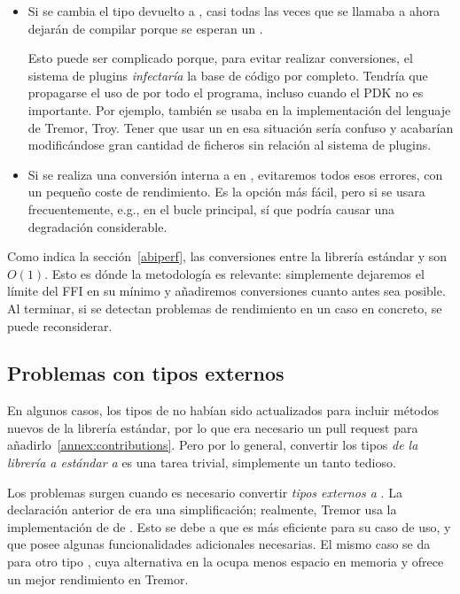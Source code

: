 \begin{itemize}
    \item Si se cambia el tipo devuelto a , casi todas las veces
        que se llamaba a  ahora dejarán de compilar porque se
        esperan un .

        Esto puede ser complicado porque, para evitar realizar conversiones, el
        sistema de plugins \emph{infectaría} la base de código por completo.
        Tendría que propagarse el uso de  por todo el programa,
        incluso cuando el PDK no es importante. Por ejemplo, 
        también se usaba en la implementación del lenguaje de Tremor, Troy.
        Tener que usar un  en esa situación sería confuso y
        acabarían modificándose gran cantidad de ficheros sin relación al
        sistema de plugins.

    \item Si se realiza una conversión interna a  en
        , evitaremos todos esos errores, con un pequeño coste de
        rendimiento. Es la opción más fácil, pero si  se
        usara frecuentemente, e.g., en el bucle principal, sí que podría causar
        una degradación considerable.
\end{itemize}

Como indica la sección~\ref{abiperf}, las conversiones entre la librería
estándar y \abistable son $O(1)$. Esto es dónde la metodología \work es
relevante: simplemente dejaremos el límite del FFI en su mínimo y añadiremos
conversiones cuanto antes sea posible. Al terminar, si se detectan problemas de
rendimiento en un caso en concreto, se puede reconsiderar.

\subsection{Problemas con tipos externos}

En algunos casos, los tipos de \abistable no habían sido actualizados para
incluir métodos nuevos de la librería estándar, por lo que era necesario un pull
request para añadirlo~\ref{annex:contributions}. Pero por lo general, convertir
los tipos \emph{de la librería a estándar a \abistable} es una tarea trivial,
simplemente un tanto tedioso.

Los problemas surgen cuando es necesario convertir \emph{tipos externos a
\abistable}. La declaración anterior de  era una simplificación;
realmente, Tremor usa la implementación de  de
. Esto se debe a que es más eficiente para su caso de uso, y
que posee algunas funcionalidades adicionales necesarias. El mismo caso se da
para otro tipo , cuya alternativa en la \crate {} ocupa
menos espacio en memoria y ofrece un mejor rendimiento en Tremor.

